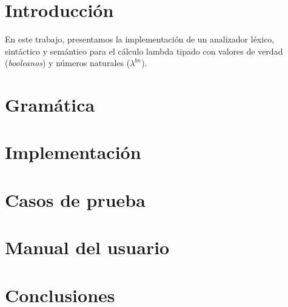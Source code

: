 \documentclass[11pt]{article}
\begin{document}

\thispagestyle{empty}
\maketitle

\newpage
\newpage
\tableofcontents

\newpage


\section{Introducción}
En este trabajo, presentamos la implementación de un analizador léxico,
sintáctico y semántico para el cálculo lambda tipado con valores de verdad
(\emph{booleanos}) y números naturales ($\lambda^{bn}$).


\section{Gramática}

\section{Implementación}

\section{Casos de prueba}

\section{Manual del usuario}

\section{Conclusiones}
\end{document}
